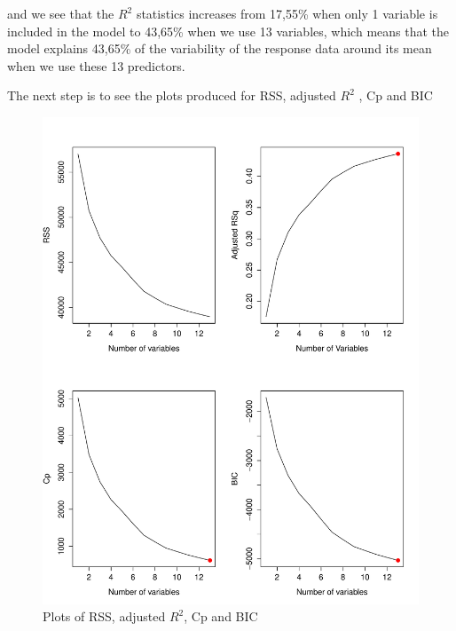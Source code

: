 \documentclass[11pt]{article}
\begin{document}
and we see that the $R^2$ statistics increases from 17,55\% when only 1 variable is included in the model to 43,65\% when we use 13 variables, which means that  the model explains 43,65\% of the variability of the response data around its mean when we use these 13 predictors.

The next step is to see the plots produced for RSS, adjusted $R^2$ , Cp and BIC
\begin{figure}[h]
    \centering
   \includegraphics[scale=0.3]{RSS_ETC_PLOT.pdf}
    \caption{Plots of RSS, adjusted $R^2$, Cp and BIC} 
    \label{fig:Plots of RSS, adjusted $R^2$, Cp and BIC}
\end{figure} 
\end{document}
